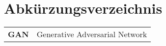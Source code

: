 
\chapter*{Abkürzungsverzeichnis}
\begin{longtable}{ll}
\textbf{GAN}  & Generative Adversarial Network \\       
\end{longtable}

\cleardoublepage